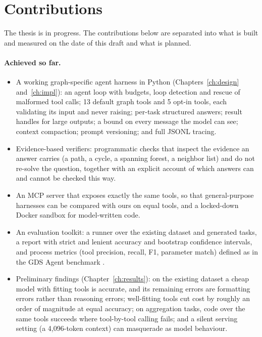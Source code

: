 \section{Contributions}

The thesis is in progress. The contributions below are separated into what is built and measured on the date of this
draft and what is planned.

\paragraph{Achieved so far.}
\begin{itemize}
  \item A working graph-specific agent harness in Python (Chapters~\ref{ch:design} and~\ref{ch:impl}): an agent loop
        with budgets, loop detection and rescue of malformed tool calls; 13 default graph tools and 5 opt-in tools,
        each validating its input and never raising; per-task structured answers; result handles for large outputs;
        a bound on every message the model can see; context compaction; prompt versioning; and full JSONL tracing.
  \item Evidence-based verifiers: programmatic checks that inspect the evidence an answer carries (a path, a cycle, a
        spanning forest, a neighbor list) and do not re-solve the question, together with an explicit account of which
        answers can and cannot be checked this way.
  \item An MCP server that exposes exactly the same tools, so that general-purpose harnesses can be compared with
        ours on equal tools, and a locked-down Docker sandbox for model-written code.
  \item An evaluation toolkit: a runner over the existing dataset and generated tasks, a report with strict and
        lenient accuracy and bootstrap confidence intervals, and process metrics (tool precision, recall, F1,
        parameter match) defined as in the GDS Agent benchmark \cite{gdsagent,gdsagentbench}.
  \item Preliminary findings (Chapter~\ref{ch:results}): on the existing dataset a cheap model with fitting tools is
        accurate, and its remaining errors are formatting errors rather than reasoning errors; well-fitting tools cut
        cost by roughly an order of magnitude at equal accuracy; on aggregation tasks, code over the same tools
        succeeds where tool-by-tool calling fails; and a silent serving setting (a 4,096-token context) can masquerade
        as model behaviour.
\end{itemize}

